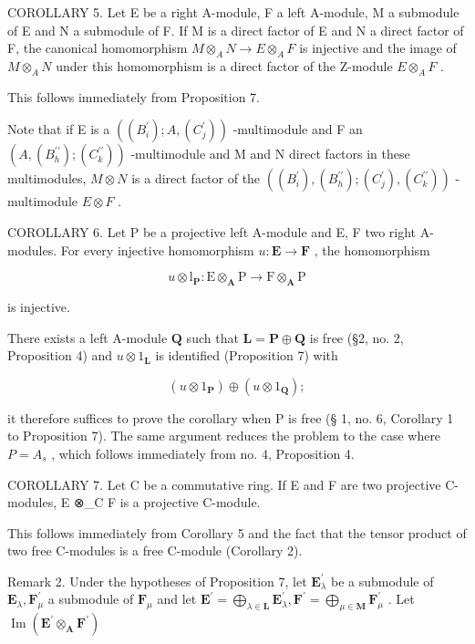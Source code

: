 COROLLARY 5. Let E be a right A-module, F a left A-module, M a submodule of E and N a submodule of F. If M is a direct factor of E and N a direct factor of F, the canonical homomorphism \(M \otimes_{A} N \to E \otimes_{A} F\) is injective and the image of \(M \otimes_{A} N\) under this homomorphism is a direct factor of the Z-module \(E \otimes_{A} F\) .

This follows immediately from Proposition 7.

Note that if E is a \(((B_{i}^{\prime}); A, (C_{j}^{\prime}))\) -multimodule and F an \((A, (B_{h}^{\prime\prime}); (C_{k}^{\prime\prime}))\) -multimodule and M and N direct factors in these multimodules, \(M \otimes N\) is a direct factor of the \(((B_{i}^{\prime}), (B_{h}^{\prime\prime}); (C_{j}^{\prime}), (C_{k}^{\prime\prime}))\) -multimodule \(E \otimes F\) .

COROLLARY 6. Let P be a projective left A-module and E, F two right A-modules. For every injective homomorphism \(u: \mathbf{E} \to \mathbf{F}\) , the homomorphism

\[
u \otimes \mathrm{l} _ {\mathbf {P}}: \mathrm{E} \otimes_ {\mathbf {A}} \mathrm{P} \rightarrow \mathrm{F} \otimes_ {\mathbf {A}} \mathrm{P}
\]

is injective.

There exists a left A-module \(\mathbf{Q}\) such that \(\mathbf{L} = \mathbf{P} \oplus \mathbf{Q}\) is free (§2, no. 2, Proposition 4) and \(u \otimes 1_{\mathbf{L}}\) is identified (Proposition 7) with

\[
(u \otimes 1 _ {\mathbf {P}}) \oplus (u \otimes 1 _ {\mathbf {Q}});
\]

it therefore suffices to prove the corollary when P is free (§ 1, no. 6, Corollary 1 to Proposition 7). The same argument reduces the problem to the case where \(P = A_{s}\) , which follows immediately from no. 4, Proposition 4.

COROLLARY 7. Let C be a commutative ring. If E and F are two projective C-modules, E ⊗\_C F is a projective C-module.

This follows immediately from Corollary 5 and the fact that the tensor product of two free C-modules is a free C-module (Corollary 2).

Remark 2. Under the hypotheses of Proposition 7, let \(\mathbf{E}_{\lambda}^{\prime}\) be a submodule of \(\mathbf{E}_{\lambda}, \mathbf{F}_{\mu}^{\prime}\) a submodule of \(\mathbf{F}_{\mu}\) and let \(\mathbf{E}^{\prime} = \bigoplus_{\lambda \in \mathbf{L}} \mathbf{E}_{\lambda}^{\prime}, \mathbf{F}^{\prime} = \bigoplus_{\mu \in \mathbf{M}} \mathbf{F}_{\mu}^{\prime}\) . Let \(\operatorname{Im}(\mathbf{E}^{\prime} \otimes_{\mathbf{A}} \mathbf{F}^{\prime})\)

